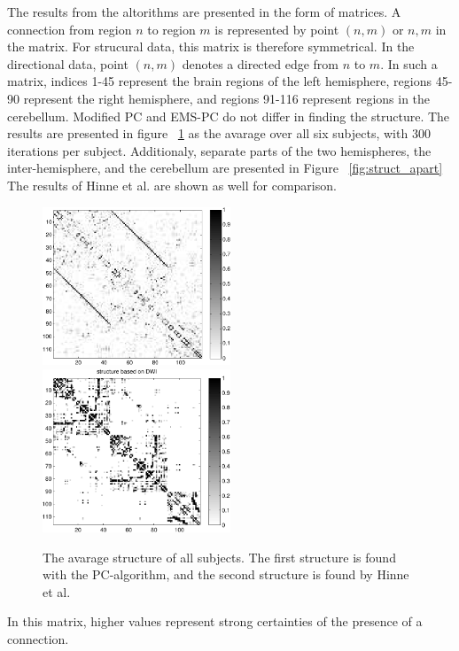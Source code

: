 \documentclass[a4paper, 10pt, english, onecolumn]{article}
\begin{document}
The results from the altorithms are presented in the form of matrices.
A connection from region $n$ to region $m$ is represented by point $(n,m)$ or $n,m$ in the matrix.
For strucural data, this matrix is therefore symmetrical.
In the directional data, point $(n,m)$ denotes a directed edge from $n$ to $m$.
In such a matrix, indices 1-45 represent the brain regions of the left hemisphere, regions 45-90 represent the right hemisphere, and regions 91-116 represent regions in the cerebellum. %
Modified PC and EMS-PC do not differ in finding the structure.
The results are presented in figure ~\ref{fig:struct_avg} as the avarage over all six subjects, with 300 iterations per subject. Additionaly, separate parts of the two hemispheres, the inter-hemisphere, and the cerebellum are presented in Figure ~\ref{fig:struct_apart}
The results of Hinne et al. are shown as well for comparison.

\begin{figure}[h!]
  \centering
  \includegraphics[width=0.5\textwidth]{images/struct_full}
  \includegraphics[width=0.5\textwidth]{images/structure_max}
  \caption{The avarage structure of all subjects. The first structure is found with the PC-algorithm, and the second structure is found by Hinne et al.}
  \label{fig:struct_avg}
\end{figure}
In this matrix, higher values represent strong certainties of the presence of a connection.
\end{document}
